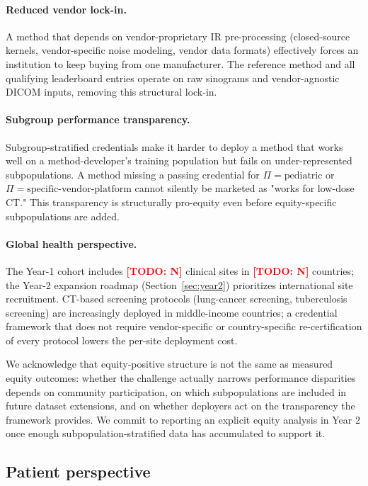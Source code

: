 \documentclass[twoside,11pt]{article}
\newcommand{\todo}[1]{\textcolor{red}{\textbf{[TODO: #1]}}}
\begin{document}
\paragraph{Reduced vendor lock-in.} A method that depends on vendor-proprietary IR pre-processing (closed-source kernels, vendor-specific noise modeling, vendor data formats) effectively forces an institution to keep buying from one manufacturer. The reference method and all qualifying leaderboard entries operate on raw sinograms and vendor-agnostic DICOM inputs, removing this structural lock-in.

\paragraph{Subgroup performance transparency.} Subgroup-stratified credentials make it harder to deploy a method that works well on a method-developer's training population but fails on under-represented subpopulations. A method missing a passing credential for $\Pi = \text{pediatric}$ or $\Pi = \text{specific-vendor-platform}$ cannot silently be marketed as "works for low-dose CT." This transparency is structurally pro-equity even before equity-specific subpopulations are added.

\paragraph{Global health perspective.} The Year-1 cohort includes \todo{N} clinical sites in \todo{N} countries; the Year-2 expansion roadmap (Section~\ref{sec:year2}) prioritizes international site recruitment. CT-based screening protocols (lung-cancer screening, tuberculosis screening) are increasingly deployed in middle-income countries; a credential framework that does not require vendor-specific or country-specific re-certification of every protocol lowers the per-site deployment cost.

We acknowledge that equity-positive structure is not the same as measured equity outcomes: whether the challenge actually narrows performance disparities depends on community participation, on which subpopulations are included in future dataset extensions, and on whether deployers act on the transparency the framework provides. We commit to reporting an explicit equity analysis in Year 2 once enough subpopulation-stratified data has accumulated to support it.

\subsection{Patient perspective}
\end{document}
